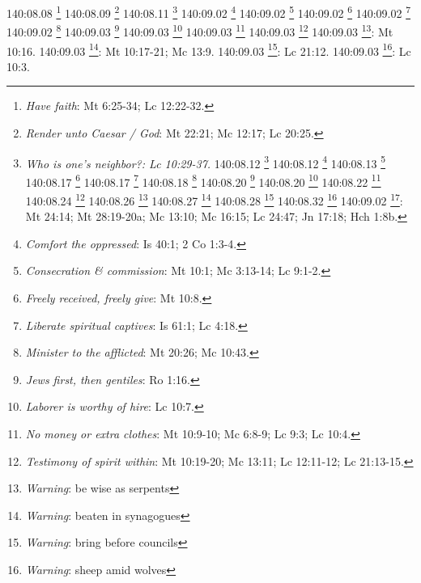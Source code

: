 {{{{{{{{{{{{{{{{{{{{{{{{{{{{{{{140:08.08 \footnote{\textit{Have faith}: Mt 6:25-34; Lc 12:22-32.}
140:08.09 \footnote{\textit{Render unto Caesar / God}: Mt 22:21; Mc 12:17; Lc 20:25.}
140:08.11 \footnote{\textit{Who is one's neighbor?: Lc 10:29-37.}
140:08.12 \footnote{\textit{Judge not lest you be judged}: Mt 7:1; Lc 6:37.}
140:08.12 \footnote{\textit{Make feasts for poor}: Lc 14:12-14.}
140:08.13 \footnote{\textit{Be wise as serpents}: Mt 10:16b.}
140:08.17 \footnote{\textit{Possessions not happiness}: Lc 12:15.}
140:08.17 \footnote{\textit{What profit to gain world}: Mt 16:26; Mc 8:36; Lc 9:25.}
140:08.18 \footnote{\textit{More blessed to give}: Hch 20:35.}
140:08.20 \footnote{\textit{"Fear not" said Jesus}: Mt 10:28,31; Mt 14:27; Mt 17:7; Mt 28:10; Mc 5:36; Mc 6:50; Lc 5:10; Lc 8:50; Lc 12:4,4,7,32; Jn 6:20; Jn 14:27.}
140:08.20 \footnote{\textit{Voluntarily do God's "will"}: Sal 143:10; Eclo 15:11-20; Mt 6:10; Mt 7:21; Mt 12:50; Mc 3:35; Lc 8:21; Lc 11:2; Jn 7:16-17; Jn 9:31; Jn 14:21-24; Jn 15:10,14-16.}
140:08.22 \footnote{\textit{First make the tree good}: Mt 12:33.}
140:08.24 \footnote{\textit{Christ as second Adam}: 1 Co 15:45-49.}
140:08.26 \footnote{\textit{True goodness is unconscious}: Mt 6:1-3.}
140:08.27 \footnote{\textit{Character growth}: Mt 13:31-32; Mc 4:31-32; Lc 13:18-19.}
140:08.28 \footnote{\textit{Pearl of great price}: Mt 13:45-46.}
140:08.32 \footnote{\textit{Be you perfect}: Gn 17:1; 1 Re 8:61; Lv 19:2; Dt 18:13; Mt 5:48; 2 Co 13:11; Stg 1:4; 1 P 1:16.}
140:09.02 \footnote{\textit{Charge}: go preach to the world}: Mt 24:14; Mt 28:19-20a; Mc 13:10; Mc 16:15; Lc 24:47; Jn 17:18; Hch 1:8b.}
140:09.02 \footnote{\textit{Comfort the oppressed}: Is 40:1; 2 Co 1:3-4.}
140:09.02 \footnote{\textit{Consecration & commission}: Mt 10:1; Mc 3:13-14; Lc 9:1-2.}
140:09.02 \footnote{\textit{Freely received, freely give}: Mt 10:8.}
140:09.02 \footnote{\textit{Liberate spiritual captives}: Is 61:1; Lc 4:18.}
140:09.02 \footnote{\textit{Minister to the afflicted}: Mt 20:26; Mc 10:43.}
140:09.03 \footnote{\textit{Jews first, then gentiles}: Ro 1:16.}
140:09.03 \footnote{\textit{Laborer is worthy of hire}: Lc 10:7.}
140:09.03 \footnote{\textit{No money or extra clothes}: Mt 10:9-10; Mc 6:8-9; Lc 9:3; Lc 10:4.}
140:09.03 \footnote{\textit{Testimony of spirit within}: Mt 10:19-20; Mc 13:11; Lc 12:11-12; Lc 21:13-15.}
140:09.03 \footnote{\textit{Warning}: be wise as serpents}: Mt 10:16.}
140:09.03 \footnote{\textit{Warning}: beaten in synagogues}: Mt 10:17-21; Mc 13:9.}
140:09.03 \footnote{\textit{Warning}: bring before councils}: Lc 21:12.}
140:09.03 \footnote{\textit{Warning}: sheep amid wolves}: Lc 10:3.}
}}}}}}}}}}}}}}}}}}}}}}}}}}}
